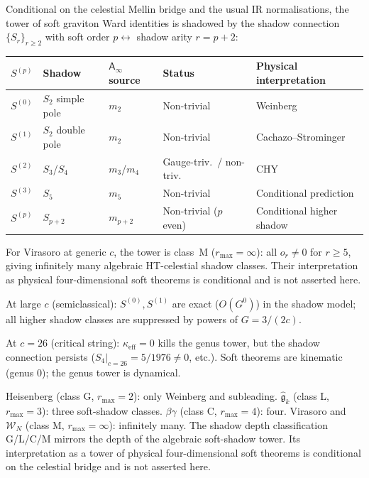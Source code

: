 \documentclass[11pt]{article}
\newcommand{\cW}{\mathcal{W}}
\newcommand{\fg}{\mathfrak{g}}
\newcommand{\Ainf}{\mathsf{A}_{\infty}}
\begin{document}
\begin{proposition}
\label{thm:soft-ainf-identification}
Conditional on the celestial Mellin bridge and the usual IR
normalisations, the tower of soft graviton Ward identities is
shadowed by the
shadow connection $\{S_r\}_{r \geq 2}$ with soft order
$p \leftrightarrow$ shadow arity $r = p + 2$:
\begin{center}
\renewcommand{\arraystretch}{1.2}
\begin{tabular}{cllll}
\textbf{$S^{(p)}$} & \textbf{Shadow} &
\textbf{$\Ainf$ source} & \textbf{Status} &
\textbf{Physical interpretation} \\
\hline
$S^{(0)}$ & $S_2$ simple pole & $m_2$ &
  Non-trivial & Weinberg \\[2pt]
$S^{(1)}$ & $S_2$ double pole & $m_2$ &
  Non-trivial & Cachazo--Strominger \\[2pt]
$S^{(2)}$ & $S_3$/$S_4$ & $m_3$/$m_4$ &
  Gauge-triv.\ / non-triv.\ & CHY \\[2pt]
$S^{(3)}$ & $S_5$ & $m_5$ &
  Non-trivial & Conditional prediction \\[2pt]
$S^{(p)}$ & $S_{p+2}$ & $m_{p+2}$ &
  Non-trivial ($p$ even) & Conditional higher shadow
\end{tabular}
\end{center}

\noindent
For Virasoro at generic $c$, the tower is class~M
($r_{\max} = \infty$): all $o_r \ne 0$ for $r \geq 5$,
giving infinitely many algebraic HT-celestial shadow classes.
Their interpretation as physical four-dimensional soft theorems
is conditional and is not asserted here.

At large $c$ (semiclassical): $S^{(0)}, S^{(1)}$ are exact
($O(G^0)$) in the shadow model; all higher shadow classes are
suppressed by powers of $G = 3/(2c)$.

At $c = 26$ (critical string): $\kappa_{\mathrm{eff}} = 0$ kills
the genus tower, but the shadow connection persists
($S_4|_{c=26} = 5/1976 \ne 0$, etc.).  Soft theorems are
kinematic (genus $0$); the genus tower is dynamical.
\end{proposition}

\begin{question}
\label{q:soft-universality}
Heisenberg (class G, $r_{\max} = 2$): only Weinberg and
subleading.  $\hat{\fg}_k$ (class L, $r_{\max} = 3$):
three soft-shadow classes.  $\beta\gamma$ (class C,
$r_{\max} = 4$): four.  Virasoro and $\cW_N$ (class M,
$r_{\max} = \infty$): infinitely many.  The shadow depth
classification G/L/C/M mirrors the depth of the algebraic
soft-shadow tower.  Its interpretation as a tower of physical
four-dimensional soft theorems is conditional on the celestial
bridge and is not asserted here.
\end{question}


\end{document}
